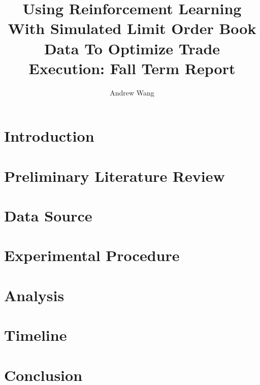 \documentclass[12pt,lot,lol,lof]{puthesis_undergraduate}
\title{Using Reinforcement Learning With Simulated Limit Order Book Data To Optimize Trade Execution: Fall Term Report}
\author{Andrew Wang}
\begin{document}
\chapter{Introduction}\label{ch:intro}  %

\chapter{Preliminary Literature Review}\label{ch:litreview}


\chapter{Data Source}\label{ch:data_source}


\chapter{Experimental Procedure}\label{ch:experiment}


\chapter{Analysis}


\chapter{Timeline}


\chapter{Conclusion}


% 

% 

% 



 \label{bib}
\end{document}
